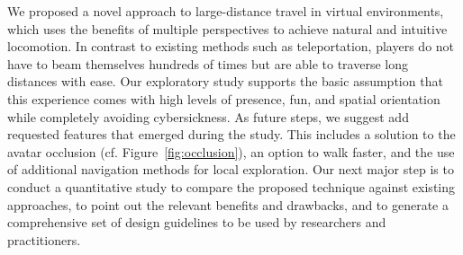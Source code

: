 \documentclass[sigchi-a, authorversion]{acmart}
\begin{document}
We proposed a novel approach to large-distance travel in virtual environments, which uses the benefits of multiple perspectives to achieve natural and intuitive locomotion. In contrast to existing methods such as teleportation, players do not have to beam themselves hundreds of times but are able to traverse long distances with ease. Our exploratory study supports the basic assumption that this experience comes with high levels of presence, fun, and spatial orientation while completely avoiding cybersickness. As future steps, we suggest add requested features that emerged during the study. This includes a solution to the avatar occlusion (cf. Figure~\ref{fig:occlusion}), an option to walk faster, and the use of additional navigation methods for local exploration. Our next major step is to conduct a quantitative study to compare the proposed technique against existing approaches, to point out the relevant benefits and drawbacks, and to generate a comprehensive set of design guidelines to be used by researchers and practitioners.





\end{document}
